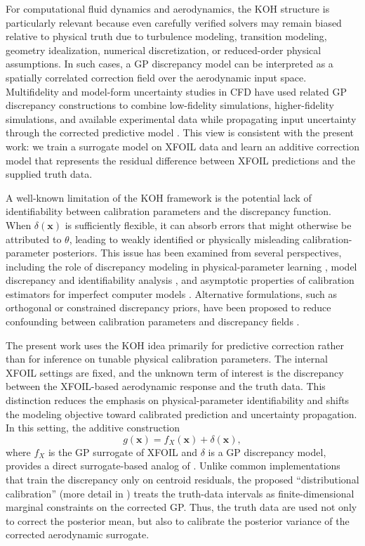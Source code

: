 \documentclass[a4paper,12pt]{article}
\newcommand{\x}{\mathbf{x}}
\begin{document}
For computational fluid dynamics and aerodynamics, the KOH structure is particularly relevant because even carefully verified solvers may remain biased relative to physical truth due to turbulence modeling, transition modeling, geometry idealization, numerical discretization, or reduced-order physical assumptions. In such cases, a GP discrepancy model can be interpreted as a spatially correlated correction field over the aerodynamic input space. Multifidelity and model-form uncertainty studies in CFD have used related GP discrepancy constructions to combine low-fidelity simulations, higher-fidelity simulations, and available experimental data while propagating input uncertainty through the corrected predictive model \cite{wang2017propagation}. This view is consistent with the present work: we train a surrogate model on XFOIL data and learn an additive correction model that represents the residual difference between XFOIL predictions and the supplied truth data.

A well-known limitation of the KOH framework is the potential lack of identifiability between calibration parameters and the discrepancy function. When $\delta(\x)$ is sufficiently flexible, it can absorb errors that might otherwise be attributed to $\theta$, leading to weakly identified or physically misleading calibration-parameter posteriors. This issue has been examined from several perspectives, including the role of discrepancy modeling in physical-parameter learning \cite{brynjarsdottir2014learning}, model discrepancy and identifiability analysis \cite{arendt2012quantification}, and asymptotic properties of calibration estimators for imperfect computer models \cite{tuo2015efficient,tuo2016theoretical}. Alternative formulations, such as orthogonal or constrained discrepancy priors, have been proposed to reduce confounding between calibration parameters and discrepancy fields \cite{plumlee2017bayesian}.

The present work uses the KOH idea primarily for predictive correction rather than for inference on tunable physical calibration parameters. The internal XFOIL settings are fixed, and the unknown term of interest is the discrepancy between the XFOIL-based aerodynamic response and the truth data. This distinction reduces the emphasis on physical-parameter identifiability and shifts the modeling objective toward calibrated prediction and uncertainty propagation. In this setting, the additive construction
\begin{equation}
    g(\x) = f_X(\x) + \delta(\x),
    \label{eq:composite_gp_review}
\end{equation}
where $f_X$ is the GP surrogate of XFOIL and $\delta$ is a GP discrepancy model, provides a direct surrogate-based analog of . Unlike common implementations that train the discrepancy only on centroid residuals, the proposed ``distributional calibration'' (more detail in ) treats the truth-data intervals as finite-dimensional marginal constraints on the corrected GP. Thus, the truth data are used not only to correct the posterior mean, but also to calibrate the posterior variance of the corrected aerodynamic surrogate.
\end{document}
